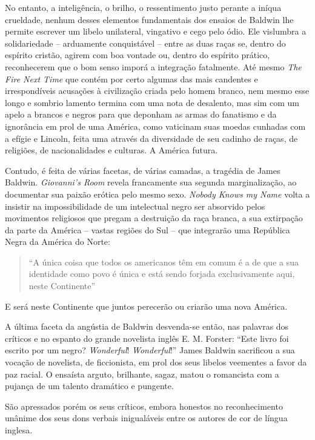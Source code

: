 \documentclass[
  letterpaper,
  DIV=11,
  numbers=noendperiod]{scrreprt}
\begin{document}
No entanto, a inteligência, o brilho, o ressentimento justo perante a
iníqua crueldade, nenhum desses elementos fundamentais dos ensaios de
Baldwin lhe permite escrever um libelo unilateral, vingativo e cego pelo
ódio. Ele vislumbra a solidariedade -- arduamente conquistável -- entre
as duas raças se, dentro do espírito cristão, agirem com boa vontade ou,
dentro do espírito prático, reconhecerem que o bom senso imporá a
integração fatalmente. Até mesmo \emph{The Fire Next Time} que contém
por certo algumas das mais candentes e irrespondíveis acusações à
civilização criada pelo homem branco, nem mesmo esse longo e sombrio
lamento termina com uma nota de desalento, mas sim com um apelo a
brancos e negros para que deponham as armas do fanatismo e da ignorância
em prol de uma América, como vaticinam suas moedas cunhadas com a efígie
e Lincoln, feita uma através da diversidade de seu cadinho de raças, de
religiões, de nacionalidades e culturas. A América futura.

Contudo, é feita de várias facetas, de várias camadas, a tragédia de
James Baldwin. \emph{Giovanni's Room} revela francamente sua segunda
marginalização, ao documentar sua paixão erótica pelo mesmo sexo.
\emph{Nobody Knows my Name} volta a insistir na impossibilidade de um
intelectual negro ser absorvido pelos movimentos religiosos que pregam a
destruição da raça branca, a sua extirpação da parte da América --
vastas regiões do Sul -- que integrarão uma República Negra da América
do Norte:

\begin{quote}
``A única coisa que todos os americanos têm em comum é a de que a sua
identidade como povo é única e está sendo forjada exclusivamente aqui,
neste Continente''
\end{quote}

E será neste Continente que juntos perecerão ou criarão uma nova
América.

A última faceta da angústia de Baldwin desvenda-se então, nas palavras
dos críticos e no espanto do grande novelista inglês E. M. Forster:
``Este livro foi escrito por um negro? \emph{Wonderful}!
\emph{Wonderful}!'' James Baldwin sacrificou a sua vocação de novelista,
de ficcionista, em prol dos seus libelos veementes a favor da paz
racial. O ensaísta arguto, brilhante, sagaz, matou o romancista com a
pujança de um talento dramático e pungente.

São apressados porém os seus críticos, embora honestos no reconhecimento
unânime dos seus dons verbais inigualáveis entre os autores de cor de
língua inglesa.
\end{document}
